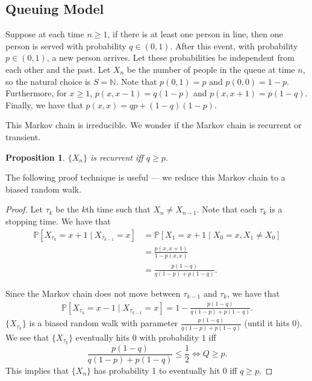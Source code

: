 \documentclass{tufte-handout}
\newcommand*\N{\mathbb{N}}
\renewcommand*\P{\mathbb{P}}
\newtheorem{prop}[thm]{Proposition}
\theoremstyle{definition}
\begin{document}
\subsection{Queuing Model}

Suppose at each time $n \ge 1$,  if there is at least one person in line, then one person is served with probability $q \in (0,1)$. After this event, with probability $p \in (0,1)$, a new person arrives. Let these probabilities be independent from each other and the past. Let $X_n$ be the number of people in the queue at time $n$, so the natural choice is $S = \N$. Note that $p(0,1) = p$ and $p(0,0) = 1-p$. Furthermore, for $x \ge 1$, $p(x,x-1) = q(1-p)$ and $p(x,x+1) = p (1-q)$. Finally, we have that $p(x,x) = qp + (1-q)(1-p)$.

This Markov chain is irreducible. We wonder if the Markov chain is recurrent or transient.

\begin{prop}
	$\{X_n\}$ is recurrent iff $q \ge p$. 
\end{prop}
The following proof technique is useful --- we reduce this Markov chain to a biased random walk.
\begin{proof}
	Let $\tau_k$ be the $k$th time such that $X_n \ne X_{n-1}$. Note that each $\tau_k$ is a stopping time. 
	We have that
	\begin{align*}
		\P\left[X_{\tau_k} = x+1 \mid X_{\tau_{k-1}} = x\right] &= \P\left[X_1 = x+1 \mid X_0 = x, X_1 \ne X_0\right]  \\
																&= \frac{p(x,x+1)}{1-p(x,x)} \\
																&= \frac{p(1-q)}{q(1-p) + p(1-q)}
	.\end{align*}

	Since the Markov chain does not move between $\tau_{k-1}$ and $\tau_{k}$, we have that
	\begin{align*}
		\P\left[X_{\tau_k} = x-1 \mid X_{\tau_{k-1}} = x\right] = 1 - \frac{p(1-q)}{q(1-p) + p(1-q)} 
	.\end{align*}
	$\{X_{\tau_k}\}$ is a biased random walk with parameter $\frac{p(1-q)}{q(1-p) + p(1-q)}$ (until it hits 0). We see that $\{X_{\tau_k}\}$ eventually hits 0 with probability $1$ iff \[
		\frac{p(1-q)}{q(1-p) + p(1-q)} \le \frac{1}{2} \iff Q \ge p
	.\] This implies that $\{X_n\}$ has probability 1 to eventually hit 0 iff $q \ge p$.

\end{proof}
\end{document}
